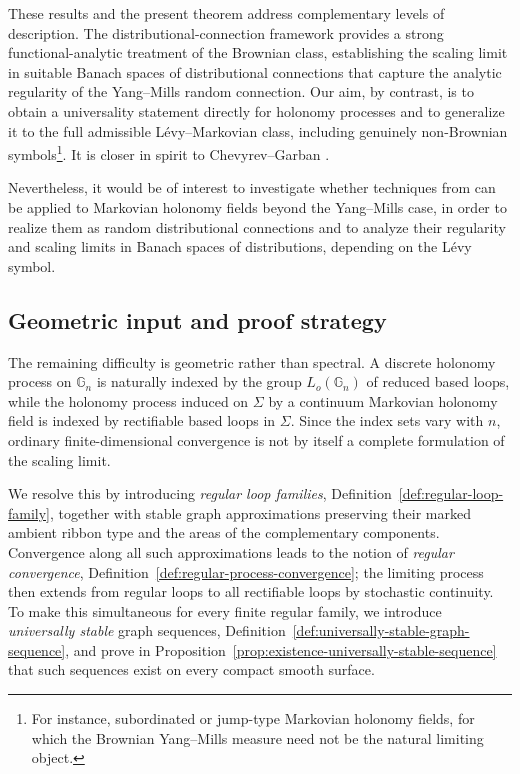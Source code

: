 \documentclass[11pt,a4paper,reqno]{article}
\theoremstyle{definition}
\theoremstyle{remark}
\newcommand\Gbb{{\mathbb{G}}}
\begin{document}
These results and the present theorem address complementary levels of description. The distributional-connection framework provides a strong functional-analytic treatment of the Brownian class, establishing the scaling limit in suitable Banach spaces of distributional connections that capture the analytic regularity of the Yang--Mills random connection. Our aim, by contrast, is to obtain a universality statement directly for holonomy processes and to generalize it to the full admissible Lévy–Markovian class, including genuinely non-Brownian symbols\footnote{For instance, subordinated or jump-type Markovian holonomy fields, for which the Brownian Yang--Mills measure need not be the natural limiting object.}. It is closer in spirit to  Chevyrev--Garban \cite{ChevGar25}.

Nevertheless, it would be of interest to investigate whether techniques from \cite{Chev19,DangNohra26,CKM,BCDRT26} can be applied to Markovian holonomy fields beyond the Yang--Mills case, in order to realize them as random distributional connections and to analyze their regularity and scaling limits in Banach spaces of distributions, depending on the Lévy symbol.

\subsection{Geometric input and proof strategy}

The remaining difficulty is geometric rather than spectral. A discrete holonomy process on $\Gbb_n$ is naturally indexed by the group $L_o(\Gbb_n)$ of reduced based loops, while the holonomy process induced on $\Sigma$ by a continuum Markovian holonomy field is indexed by rectifiable based loops in $\Sigma$. Since the index sets vary with $n$, ordinary finite-dimensional convergence is not by itself a complete formulation of the scaling limit.

We resolve this by introducing \emph{regular loop families}, Definition~\ref{def:regular-loop-family}, together with stable graph approximations preserving their marked ambient ribbon type and the areas of the complementary components. Convergence along all such approximations leads to the notion of \emph{regular convergence}, Definition~\ref{def:regular-process-convergence}; the limiting process then extends from regular loops to all rectifiable loops by stochastic continuity. To make this simultaneous for every finite regular family, we introduce \emph{universally stable} graph sequences, Definition~\ref{def:universally-stable-graph-sequence}, and prove in Proposition~\ref{prop:existence-universally-stable-sequence} that such sequences exist on every compact smooth surface.
\end{document}
